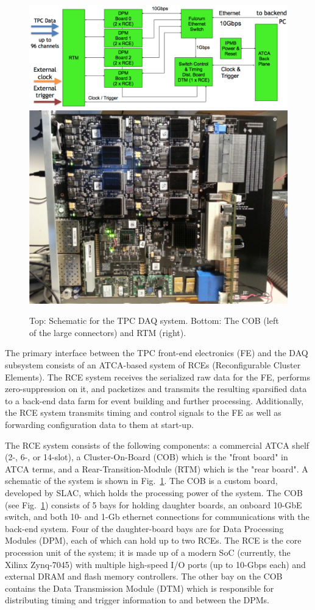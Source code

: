 \begin{figure}[htb]
\centering
\begin{minipage}[b]{1.0\textwidth}
\begin{center}
\includegraphics[width=1.0\textwidth]{figures/rce-block.pdf}
\includegraphics[width=.5\textwidth]{figures/COB-gen3.pdf}
\end{center}
\end{minipage}
\caption{Top: Schematic for the TPC DAQ system. Bottom: The COB (left of the large connectors) and RTM (right).}
\label{fig:rce}
\end{figure}

The primary interface between the TPC front-end electronics (FE) and the DAQ subsystem consists of an ATCA-based system of
RCEs (Reconfigurable Cluster Elements).
The RCE system receives the serialized raw data for the FE, performs zero-suppression on it,
and packetizes and transmits the resulting sparsified data to a back-end data farm for event building and further processing.
Additionally, the RCE system transmits timing and control signals to the FE as well as forwarding configuration data
to them at start-up.     

The RCE system consists of the following components:
a commercial ATCA shelf (2-, 6-, or 14-slot), a Cluster-On-Board (COB) which is the "front board" in ATCA terms,
and a Rear-Transition-Module (RTM) which is the "rear board".
A schematic of the system is shown in Fig.~\ref{fig:rce}.
The COB is a custom board, developed by SLAC, which holds the processing power of the system.
The COB (see Fig.~\ref{fig:rce}) consists of 5 bays for holding daughter boards, an onboard 10-GbE switch,
and both 10- and 1-Gb ethernet connections for communications with the back-end system.
Four of the daughter-board bays are for Data Processing Modules (DPM), each of which can hold up to two RCEs.
The RCE is the core procession unit of the system; it is made up of a modern SoC (currently, the Xilinx Zynq-7045)
with multiple high-speed I/O ports (up to 10-Gbps each) and external DRAM and flash memory controllers.
The other bay on the COB contains the Data Transmission Module (DTM) which is responsible
for distributing timing and trigger information to and between the DPMs.  

